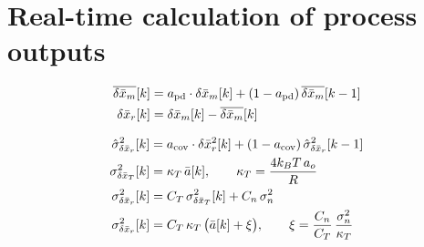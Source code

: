 \clearpage
\section{Real-time calculation of process outputs}

\[
\begin{aligned}
\overline{\delta\bar{x}_m}[k] &= a_{\mathrm{pd}}\cdot\delta\bar{x}_m[k] + (1 - a_{\mathrm{pd}})\,\overline{\delta\bar{x}_m}[k-1] \\
\delta\bar{x}_r[k] &= \delta\bar{x}_m[k] - \overline{\delta\bar{x}_m}[k]
\end{aligned}
\]

\[
\begin{aligned}
\hat\sigma^2_{\delta\bar{x}_r}[k] &= a_{\mathrm{cov}}\cdot\delta\bar{x}_r^2[k] + (1 - a_{\mathrm{cov}})\,\hat\sigma^2_{\delta\bar{x}_r}[k-1] \\
\sigma^2_{\delta\bar{x}_T}[k] &= \kappa_T\,\bar{a}[k], \qquad \kappa_T = \frac{4 k_B T\, a_o}{R} \\
\sigma^2_{\delta\bar{x}_r}[k] &= C_T\,\sigma^2_{\delta\bar{x}_T}[k] + C_n\,\sigma^2_{n} \\
\sigma^2_{\delta\bar{x}_r}[k] &= C_T\,\kappa_T\,\big(\bar{a}[k] + \xi\big), \qquad \xi = \frac{C_n}{C_T}\,\frac{\sigma^2_n}{\kappa_T}
\end{aligned}
\]

